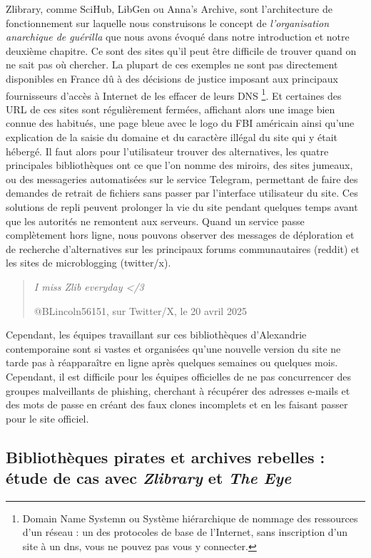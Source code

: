 Zlibrary, comme SciHub, LibGen ou Anna's Archive, sont l'architecture de fonctionnement sur laquelle nous construisons le concept de \textit{l’organisation anarchique de guérilla} que nous avons évoqué dans notre introduction et notre deuxième chapitre. Ce sont des sites qu'il peut être difficile de trouver quand on ne sait pas où chercher. La plupart de ces exemples ne sont pas directement disponibles en France dû à des décisions de justice imposant aux principaux fournisseurs d'accès à Internet de les effacer de leurs DNS \footnote{
Domain Name Systemn ou Système hiérarchique de nommage des ressources d'un réseau : un des protocoles de base de l'Internet, sans inscription d'un site à un dns, vous ne pouvez pas vous y connecter.
}. Et certaines des URL de ces sites sont régulièrement fermées, affichant alors une image bien connue des habitués, une page bleue avec le logo du FBI américain ainsi qu'une explication de la saisie du domaine et du caractère illégal du site qui y était hébergé. Il faut alors pour l'utilisateur trouver des alternatives, les quatre principales bibliothèques ont ce que l'on nomme des miroirs, des sites jumeaux, ou des messageries automatisées sur le service Telegram, permettant de faire des demandes de retrait de fichiers sans passer par l'interface utilisateur du site. Ces solutions de repli peuvent prolonger la vie du site pendant quelques temps avant que les autorités ne remontent aux serveurs. Quand un service passe complètement hors ligne, nous pouvons observer des messages de déploration et de recherche d'alternatives sur les principaux forums communautaires (reddit) et les sites de microblogging (twitter/x).

\begin{quote}
    \textit{I miss Zlib everyday </3}

    @BLincoln56151, sur Twitter/X, le 20 avril 2025
\end{quote}

Cependant, les équipes travaillant sur ces bibliothèques d'Alexandrie contemporaine sont si vastes et organisées qu'une nouvelle version du site ne tarde pas à réapparaître en ligne après quelques semaines ou quelques mois. Cependant, il est difficile pour les équipes officielles de ne pas concurrencer des groupes malveillants de phishing, cherchant à récupérer des adresses e-mails et des mots de passe en créant des faux clones incomplets et en les faisant passer pour le site officiel.

\subsection*{Bibliothèques pirates et archives rebelles : étude de cas avec \textit{Zlibrary} et \textit{The Eye}}

